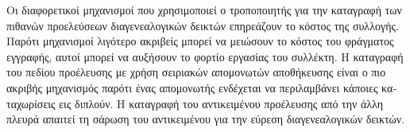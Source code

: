 \begin{greek}
Οι διαφορετικοί μηχανισμοί που χρησιμοποιεί ο τροποποιητής για
την καταγραφή των πιθανών προελεύσεων διαγενεαλογικών δεικτών
επηρεάζουν το κόστος της συλλογής. Παρότι μηχανισμοί λιγότερο
ακριβείς μπορεί να μειώσουν το κόστος του φράγματος εγγραφής,
αυτοί μπορεί να αυξήσουν το φορτίο εργασίας του συλλέκτη.
Η καταγραφή του πεδίου προέλευσης με χρήση σειριακών απομονωτών
αποθήκευσης είναι ο πιο ακριβής μηχανισμός παρότι ένας απομονωτής
ενδέχεται να περιλαμβάνει κάποιες καταχωρίσεις εις διπλούν.
Η καταγραφή του αντικειμένου προέλευσης από την άλλη πλευρά
απαιτεί τη σάρωση του αντικειμένου για την εύρεση διαγενεαλογικών
δεικτών.

\end{greek}



